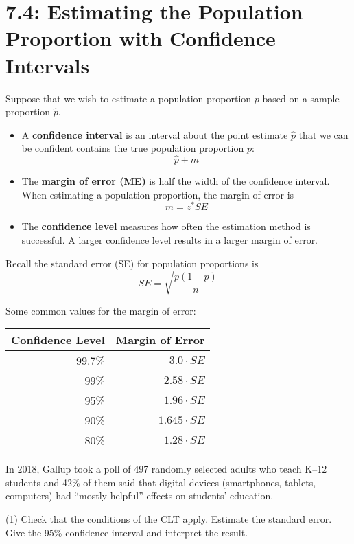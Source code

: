 \documentclass[../mathNotesPreamble]{subfiles}
\providecommand{\relscalefact}{1.4}
\begin{document}
\relscale{\relscalefact}
  \section{7.4: Estimating the Population Proportion with Confidence Intervals}
    \begin{defn*}
      Suppose that we wish to estimate a population proportion $p$ based on a sample proportion $\hat{p}$.
      \begin{itemize}
        \item A \textbf{confidence interval} is an interval about the point estimate $\hat{p}$ that we can be confident contains the true population proportion $p$:
          \[\hat{p}\pm m\]
        \item The \textbf{margin of error (ME)} is half the width of the confidence interval. When estimating a population proportion, the margin of error is
          \[m=z^* SE\]
        \item The \textbf{confidence level} measures how often the estimation method is successful. A larger confidence level results in a larger margin of error.
      \end{itemize}
    \end{defn*}

    Recall the standard error (SE) for population proportions is
      \[SE=\sqrt{\frac{p(1-p)}{n}}\]

    \noindent
    Some common values for the margin of error:
    \begin{center}
      \begin{tabular}{@{}rr@{}}\toprule
        Confidence Level& Margin of Error\\\midrule
        99.7\%& $3.0\cdot SE$\\
        99\%& $2.58\cdot SE$\\
        95\%& $1.96\cdot SE$\\
        90\%& $1.645\cdot SE$\\
        80\%& $1.28\cdot SE$\\\bottomrule
      \end{tabular}
    \end{center}
    \pagebreak

    \begin{ex*}
      In 2018, Gallup took a poll of 497 randomly selected adults who teach K--12 students and 42\% of them said that digital devices (smartphones, tablets, computers) had ``mostly helpful'' effects on students' education.
    \end{ex*}
    \begin{extasks}[after-item-skip=\stretch{1}](1)
      \task Check that the conditions of the CLT apply.
      \task Estimate the standard error.
      \task Give the 95\% confidence interval and interpret the result.
    \end{extasks}
    \pagebreak
\end{document}
